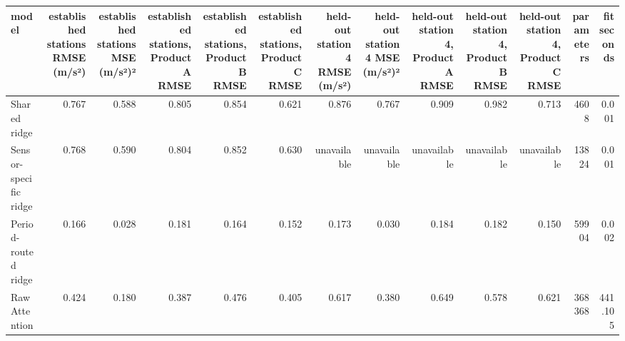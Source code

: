 \begin{tabular}{lrrrrrrrrrrrr}
\toprule
model & established stations RMSE (m/s²) & established stations MSE (m/s²)² & established stations, Product A RMSE & established stations, Product B RMSE & established stations, Product C RMSE & held-out station 4 RMSE (m/s²) & held-out station 4 MSE (m/s²)² & held-out station 4, Product A RMSE & held-out station 4, Product B RMSE & held-out station 4, Product C RMSE & parameters & fit seconds \\
\midrule
Shared ridge & 0.767 & 0.588 & 0.805 & 0.854 & 0.621 & 0.876 & 0.767 & 0.909 & 0.982 & 0.713 & 4608 & 0.001 \\
Sensor-specific ridge & 0.768 & 0.590 & 0.804 & 0.852 & 0.630 & unavailable & unavailable & unavailable & unavailable & unavailable & 13824 & 0.001 \\
Period-routed ridge & 0.166 & 0.028 & 0.181 & 0.164 & 0.152 & 0.173 & 0.030 & 0.184 & 0.182 & 0.150 & 59904 & 0.002 \\
Raw Attention & 0.424 & 0.180 & 0.387 & 0.476 & 0.405 & 0.617 & 0.380 & 0.649 & 0.578 & 0.621 & 368368 & 441.105 \\
\bottomrule
\end{tabular}
